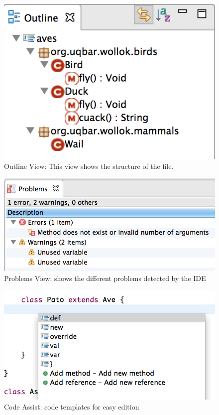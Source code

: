\begin{figure}[ht]
    \centering
	\includegraphics[scale=0.5]{images/wollok-paper-outline.png}
    \caption{Outline View: This view shows the structure of the file.}
    \label{fig:outline.png}
\end{figure}

\begin{figure}[ht]
    \centering
	\includegraphics[scale=0.5]{images/wollok-paper-check-problemsview.png}
    \caption{Problems View: shows the different problems detected by the IDE }
    \label{fig:problemsview.png}
\end{figure}

\begin{figure}[ht]
    \centering
	\includegraphics[scale=0.5]{images/wollok-paper-codetemplates.png}
    \caption{Code Assist: code templates for easy edition}
    \label{fig:codetemplates.png}
\end{figure}

